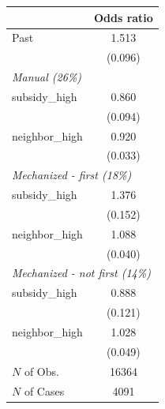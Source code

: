\begin{tabular}{lc}
\hline\hline
 & Odds ratio \\
\hline
Past & 1.513 \\
 & (0.096) \\
\multicolumn{2}{l}{\textit{Manual (26\%)}} \\
subsidy_high & 0.860 \\
 & (0.094) \\
neighbor_high & 0.920 \\
 & (0.033) \\
\multicolumn{2}{l}{\textit{Mechanized - first (18\%)}} \\
subsidy_high & 1.376 \\
 & (0.152) \\
neighbor_high & 1.088 \\
 & (0.040) \\
\multicolumn{2}{l}{\textit{Mechanized - not first (14\%)}} \\
subsidy_high & 0.888 \\
 & (0.121) \\
neighbor_high & 1.028 \\
 & (0.049) \\
\hline
$N$ of Obs. & 16364 \\
$N$ of Cases & 4091 \\
\hline\hline
\end{tabular}

